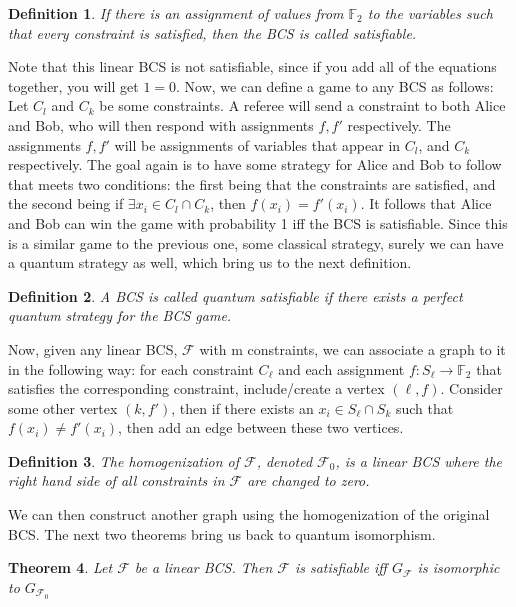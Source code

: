 \documentclass[12pt]{article}
\newtheorem{thm}{Theorem}[section]
\newtheorem{defn}[thm]{Definition}
\begin{document}
\begin{defn}
If there is an assignment of values from $\mathbb{F}_2$ to the variables such that every constraint is satisfied, then the BCS is called satisfiable.
\end{defn}
Note that this linear BCS is not satisfiable, since if you add all of the equations together, you will get $1=0$. Now, we can define a game to any BCS as follows: Let $C_l$ and $C_k$ be some constraints. A referee will send a constraint to both Alice and Bob, who will then respond with assignments $f, f'$ respectively. The assignments $f, f'$ will be assignments of variables that appear in $C_l$, and $C_k$ respectively. The goal again is to have some strategy for Alice and Bob to follow that meets two conditions: the first being that the constraints are satisfied, and the second being if $\exists x_i \in C_l \cap C_k$, then $f(x_i) = f'(x_i)$. It follows that Alice and Bob can win the game with probability 1 iff the BCS is satisfiable. Since this is a similar game to the previous one, some classical strategy, surely we can have a quantum strategy as well, which bring us to the next definition.
\begin{defn}
A BCS is called quantum satisfiable if there exists a perfect quantum strategy for the BCS game.
\end{defn}

Now, given any linear BCS, $\mathcal{F}$ with m constraints, we can associate a graph to it in the following way: for each constraint $C_{\ell}$ and each assignment $f:S_{\ell} \rightarrow \mathbb{F}_2$ that satisfies the corresponding constraint, include/create a vertex $(\ell, f)$. Consider some other vertex $(k, f')$, then if there exists an $x_i \in S_{\ell} \cap S_{k}$ such that $f(x_i) \neq  f'(x_i)$, then add an edge between these two vertices.

\begin{defn}
The homogenization of $\mathcal{F}$, denoted $\mathcal{F}_0$, is a linear BCS where the right hand side of all constraints in $\mathcal{F}$ are changed to zero.
\end{defn}
We can then construct another graph using the homogenization of the original BCS. The next two theorems bring us back to quantum isomorphism.


\begin{thm}
\label{classicalBCS}
Let $\mathcal{F}$ be a linear BCS. Then $\mathcal{F}$ is satisfiable iff $G_{\mathcal{F}}$ is isomorphic to $G_{\mathcal{F}_0}$
\end{thm}
\end{document}
